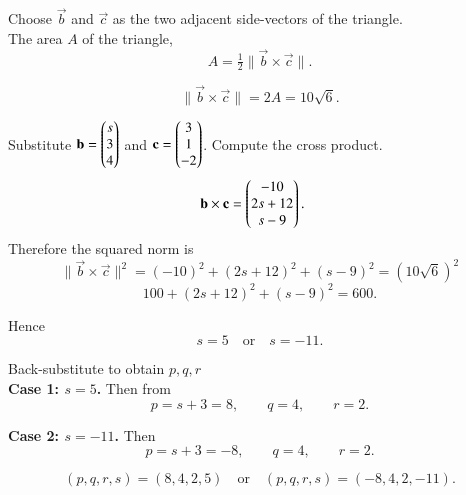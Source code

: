 \documentclass[journal]{IEEEtran}
\begin{document}
Choose $\vec{b}$ and $\vec{c}$ as the two adjacent side-vectors of the triangle.\\ The area $A$ of the triangle,
\begin{equation}\label{eq:area_formula}
A=\tfrac{1}{2}\|\vec{b}\times\vec{c}\|.
\end{equation}

\begin{equation}
\|\vec{b}\times\vec{c}\| = 2A = 10\sqrt{6}.
\end{equation}

Substitute $\mathbf{b}=\begin{pmatrix}s\\3\\4\end{pmatrix}$ and $\mathbf{c}=\begin{pmatrix}3\\1\\-2\end{pmatrix}$. Compute the cross product.
\begin{align}
\mathbf{b}\times\mathbf{c}
&= \begin{pmatrix}-10\\2s+12\\s-9\end{pmatrix}.
\end{align}
Therefore the squared norm is
\begin{equation}\label{eq:norm_squared}
\|\vec{b}\times\vec{c}\|^2 = (-10)^2 + (2s+12)^2 + (s-9)^2 = (10\sqrt{6})^2
\end{equation}
\begin{equation}\label{eq:area_equation}
100 + (2s+12)^2 + (s-9)^2 = 600.
\end{equation}

Hence
\begin{equation}\label{eq:s_values}
s = 5 \quad\text{or}\quad s = -11.
\end{equation}

Back-substitute to obtain $p,q,r$\\
\noindent
\textbf{Case 1: $s=5$.} Then from 
\begin{equation}\label{eq:case1}
p = s+3 = 8,\qquad q=4,\qquad r=2.
\end{equation}

\textbf{Case 2: $s=-11$.} Then
\begin{equation}
\label{eq:case2}
p = s+3 = -8,\qquad q=4,\qquad r=2.
\end{equation}

\begin{equation}\label{eq:final_answer}
(p,q,r,s) = (8,4,2,5)\quad\text{or}\quad (p,q,r,s)=(-8,4,2,-11).
\end{equation}
\end{document}
